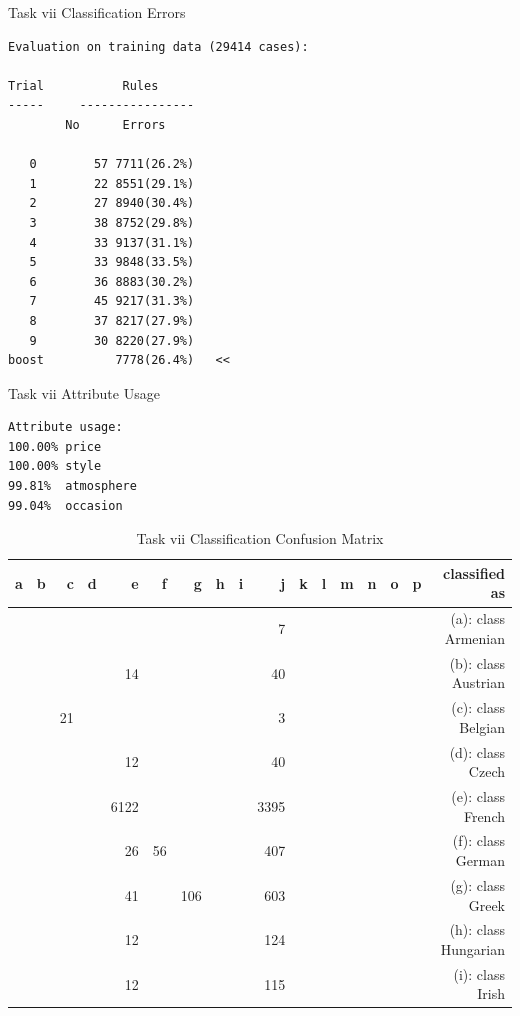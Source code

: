 \documentclass[letterpaper,10pt]{article}
\begin{document}
\begin{table}[H]
\centering
\setlength\tabcolsep{2pt}
\begin{minipage}{0.38\textwidth}
\caption{Task vii Classification Errors}
\begin{verbatim}
Evaluation on training data (29414 cases):

Trial	        Rules     
-----	  ----------------
	    No      Errors

   0	    57 7711(26.2%)
   1	    22 8551(29.1%)
   2	    27 8940(30.4%)
   3	    38 8752(29.8%)
   4	    33 9137(31.1%)
   5	    33 9848(33.5%)
   6	    36 8883(30.2%)
   7	    45 9217(31.3%)
   8	    37 8217(27.9%)
   9	    30 8220(27.9%)
boost	       7778(26.4%)   <<
\end{verbatim}
\label{tab:tvii_err} 
\end{minipage}
\begin{minipage}{0.48\textwidth}
\centering
\caption{Task vii Attribute Usage} 
\begin{verbatim}
Attribute usage:
100.00%	price
100.00%	style
99.81%	atmosphere
99.04%	occasion
\end{verbatim}
 \label{tab:tvii_au} 
\end{minipage}
\begin{minipage}{\textwidth}
\centering
\caption{Task vii Classification Confusion Matrix} 
\begin{tabu}{rrrrrrrrrrrrrrrrr}
\hline
a & b & c & d & e & f & g & h & i & j & k & l & m & n & o & p & classified as \\ \hline
 &  &  &  &  &  &  &  &  & 7 &  &  &  &  &  &  & (a): class Armenian \\ \hline
 &  &  &  & 14 &  &  &  &  & 40 &  &  &  &  &  &  & (b): class Austrian \\ \hline
 &  & 21 &  &  &  &  &  &  & 3 &  &  &  &  &  &  & (c): class Belgian \\ \hline
 &  &  &  & 12 &  &  &  &  & 40 &  &  &  &  &  &  & (d): class Czech \\ \hline
 &  &  &  & 6122 &  &  &  &  & 3395 &  &  &  &  &  &  & (e): class French \\ \hline
 &  &  &  & 26 & 56 &  &  &  & 407 &  &  &  &  &  &  & (f): class German \\ \hline
 &  &  &  & 41 &  & 106 &  &  & 603 &  &  &  &  &  &  & (g): class Greek \\ \hline
 &  &  &  & 12 &  &  &  &  & 124 &  &  &  &  &  &  & (h): class Hungarian \\ \hline
 &  &  &  & 12 &  &  &  &  & 115 &  &  &  &  &  &  & (i): class Irish \\ \hline

\end{tabu}
\end{minipage}
\end{table}
\end{document}
